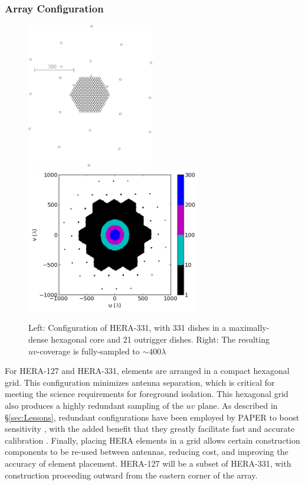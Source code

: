\documentclass[preprint]{aastex}
\newcommand{\compress}{\vspace{-0.3in}}
\begin{document}
\compress
\subsubsection{Array Configuration}

\begin{figure}[t]
\centering
		\includegraphics[height=2.5in]{plots/hera352.png}
		\includegraphics[height=2.5in]{plots/HERA_331_uv_clipped.png}
\caption{\small
Left: Configuration of HERA-331, with 331 dishes in a maximally-dense hexagonal core and 21 outrigger dishes.  Right: The resulting $uv$-coverage is fully-sampled to $\sim 400\lambda$ %
}\label{fig:uv_coverage}
\end{figure}

For HERA-127 and HERA-331, elements are arranged in a compact hexagonal grid.
This configuration minimizes antenna separation, which is critical for meeting
the science requirements for foreground isolation.  This hexagonal grid also
produces a highly redundant sampling of the $uv$ plane.  As described in
\S\ref{sec:Lessons}, redundant configurations have been employed by PAPER to
boost sensitivity \citep{parsons_et_al2012a}, with the added benefit that they
greatly facilitate fast and accurate calibration
\citep{liu_et_al2010,parsons_et_al2013}.  Finally, placing HERA elements in a
grid allows certain construction components to be re-used between antennas,
reducing cost, and improving the accuracy of element placement.  HERA-127 will
be a subset of HERA-331, with construction proceeding outward from the eastern
corner of the array.
\end{document}
